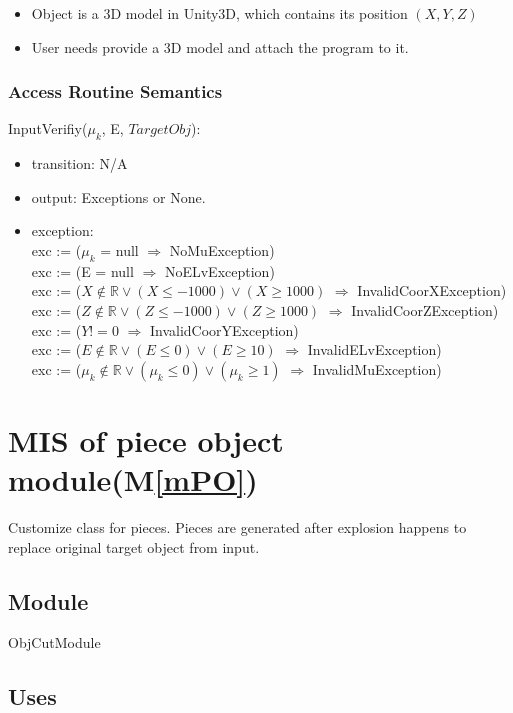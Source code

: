 \documentclass[12pt, titlepage]{article}
\newcommand{\mref}[1]{M\ref{#1}}
\begin{document}
\begin{itemize}
	\item Object is a 3D model in Unity3D, which contains its position $(X,Y,Z)$
	\item User needs provide a 3D model and attach the program to it.
\end{itemize}
\subsubsection{Access Routine Semantics}

\noindent InputVerifiy($\mu_{k}$, E, $TargetObj$):
\begin{itemize}
\item transition: N/A
\item output: Exceptions or None.
\item exception:\\
exc := ($\mu_{k}$ = null $\Rightarrow $ NoMuException)\\
exc := (E = null $\Rightarrow $ NoELvException)\\
exc := ($X \notin \mathbb{R} \vee (X \le -1000) \vee (X \ge 1000)$ $\Rightarrow $ InvalidCoorXException)\\
exc := ($Z \notin \mathbb{R} \vee (Z \le -1000) \vee (Z \ge 1000)$ $\Rightarrow $ InvalidCoorZException)\\
exc := ($Y != 0$ $\Rightarrow $ InvalidCoorYException)\\
exc := ($E \notin \mathbb{R} \vee (E \leq 0) \vee (E \geq 10)$ $\Rightarrow $ InvalidELvException)\\
exc := ($\mu_{k} \notin \mathbb{R} \vee (\mu_{k} \le 0) \vee (\mu_{k} \ge 1)$ $\Rightarrow $ InvalidMuException)\\
\end{itemize}

\section{MIS of piece object module(\mref{mPO})}

Customize class for pieces. Pieces are generated after explosion happens to replace original target object from input.

\subsection{Module}

ObjCutModule

\subsection{Uses}
\end{document}

